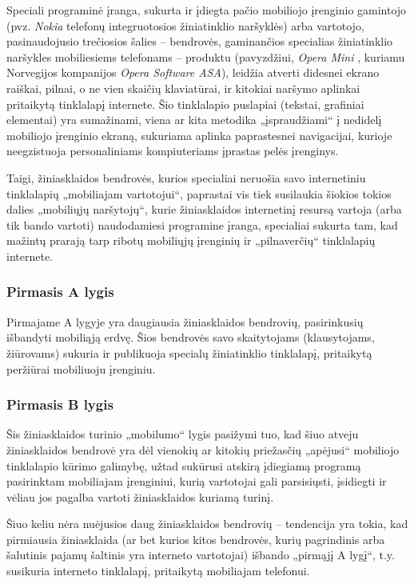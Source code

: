 \documentclass[kursinis-darbas]{vukf}
\begin{document}
Speciali programinė įranga, sukurta ir įdiegta pačio mobiliojo įrenginio gamintojo (pvz. \emph{Nokia} telefonų integruotosios žiniatinklio naršyklės) arba vartotojo, pasinaudojusio trečiosios šalies – bendrovės, gaminančios specialias žiniatinklio naršykles mobiliesiems telefonams – produktu (pavyzdžiui, \emph{Opera Mini} \cite{opera_mini_and_mobile}, kuriamu Norvegijos kompanijos \emph{Opera Software ASA}), leidžia atverti didesnei ekrano raiškai, pilnai, o ne vien skaičių klaviatūrai, ir kitokiai naršymo aplinkai pritaikytą tinklalapį internete. Šio tinklalapio puslapiai (tekstai, grafiniai elementai) yra sumažinami, viena ar kita metodika „įspraudžiami“ į nedidelį mobiliojo įrenginio ekraną, sukuriama aplinka paprastesnei navigacijai, kurioje neegzistuoja personaliniams kompiuteriams įprastas pelės įrenginys.

Taigi, žiniasklaidos bendrovės, kurios specialiai neruošia savo internetiniu tinklalapių „mobiliajam vartotojui“, paprastai vis tiek susilaukia šiokios tokios dalies „mobiliųjų naršytojų“, kurie žiniasklaidos internetinį resursą vartoja (arba tik bando vartoti) naudodamiesi programine įranga, specialiai sukurta tam, kad mažintų prarają tarp ribotų mobiliųjų įrenginių ir „pilnaverčių“ tinklalapių internete.


\subsubsection{Pirmasis A lygis}

Pirmajame A lygyje yra daugiausia žiniasklaidos bendrovių, pasirinkusių išbandyti mobiliąją erdvę. Šios bendrovės savo skaitytojams (klausytojams, žiūrovams) sukuria ir publikuoja specialų žiniatinklio tinklalapį, pritaikytą peržiūrai mobiliuoju įrenginiu.


\subsubsection{Pirmasis B lygis}

Šis žiniasklaidos turinio „mobilumo“ lygis pasižymi tuo, kad šiuo atveju žiniasklaidos bendrovė yra dėl vienokių ar kitokių priežasčių „apėjusi“ mobiliojo tinklalapio kūrimo galimybę, užtad sukūrusi atskirą įdiegiamą programą pasirinktam mobiliajam įrenginiui, kurią vartotojai gali parsisiųsti, įsidiegti ir vėliau jos pagalba vartoti žiniasklaidos kuriamą turinį.

Šiuo keliu nėra nuėjusios daug žiniasklaidos bendrovių – tendencija yra tokia, kad pirmiausia žiniasklaida (ar bet kurios kitos bendrovės, kurių pagrindinis arba šalutinis pajamų šaltinis yra interneto vartotojai) išbando „pirmąjį A lygį“, t.y. susikuria interneto tinklalapį, pritaikytą mobiliajam telefonui.
\end{document}
